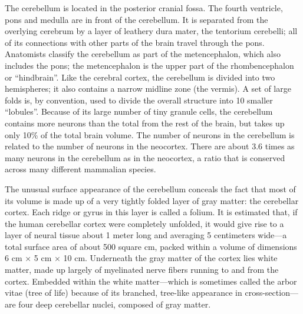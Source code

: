 The cerebellum is located in the posterior cranial fossa. The fourth ventricle, pons and medulla are in front of the cerebellum. It is separated from the overlying cerebrum by a layer of leathery dura mater, the tentorium cerebelli; all of its connections with other parts of the brain travel through the pons. Anatomists classify the cerebellum as part of the metencephalon, which also includes the pons; the metencephalon is the upper part of the rhombencephalon or ``hindbrain''. Like the cerebral cortex, the cerebellum is divided into two hemispheres; it also contains a narrow midline zone (the vermis). A set of large folds is, by convention, used to divide the overall structure into 10 smaller ``lobules''. Because of its large number of tiny granule cells, the cerebellum contains more neurons than the total from the rest of the brain, but takes up only 10\% of the total brain volume. The number of neurons in the cerebellum is related to the number of neurons in the neocortex. There are about 3.6 times as many neurons in the cerebellum as in the neocortex, a ratio that is conserved across many different mammalian species.

The unusual surface appearance of the cerebellum conceals the fact that most of its volume is made up of a very tightly folded layer of gray matter: the cerebellar cortex. Each ridge or gyrus in this layer is called a folium. It is estimated that, if the human cerebellar cortex were completely unfolded, it would give rise to a layer of neural tissue about 1 meter long and averaging 5 centimeters wide---a total surface area of about 500 square cm, packed within a volume of dimensions 6 cm × 5 cm × 10 cm. Underneath the gray matter of the cortex lies white matter, made up largely of myelinated nerve fibers running to and from the cortex. Embedded within the white matter---which is sometimes called the arbor vitae (tree of life) because of its branched, tree-like appearance in cross-section---are four deep cerebellar nuclei, composed of gray matter.

